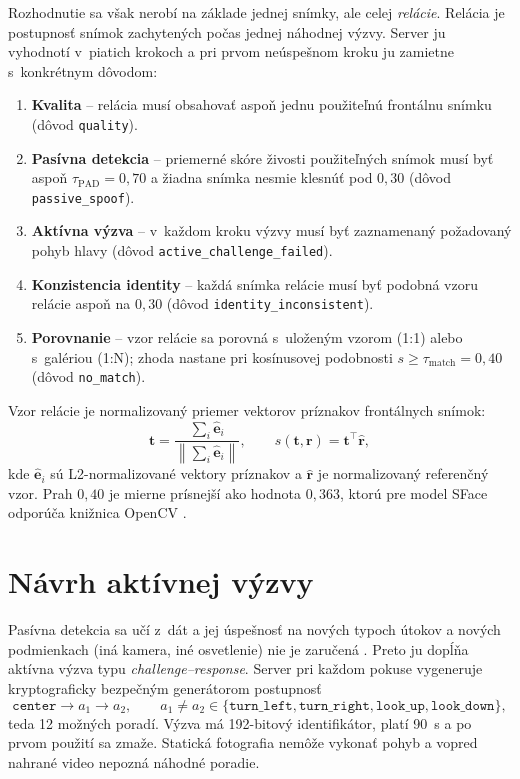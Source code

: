 Rozhodnutie sa však nerobí na základe jednej snímky, ale celej \emph{relácie}.
Relácia je postupnosť snímok zachytených počas jednej náhodnej výzvy. Server ju
vyhodnotí v~piatich krokoch a pri prvom neúspešnom kroku ju zamietne s~konkrétnym
dôvodom:

\begin{enumerate}
  \item \textbf{Kvalita} -- relácia musí obsahovať aspoň jednu použiteľnú frontálnu snímku
        (dôvod \texttt{quality}).
  \item \textbf{Pasívna detekcia} -- priemerné skóre živosti použiteľných snímok musí byť
        aspoň $\tau_{\mathrm{PAD}} = 0{,}70$ a žiadna snímka nesmie klesnúť pod $0{,}30$
        (dôvod \texttt{passive\_spoof}).
  \item \textbf{Aktívna výzva} -- v~každom kroku výzvy musí byť zaznamenaný požadovaný
        pohyb hlavy (dôvod \texttt{active\_challenge\_failed}).
  \item \textbf{Konzistencia identity} -- každá snímka relácie musí byť podobná vzoru
        relácie aspoň na $0{,}30$ (dôvod \texttt{identity\_inconsistent}).
  \item \textbf{Porovnanie} -- vzor relácie sa porovná s~uloženým vzorom (1:1) alebo
        s~galériou (1:N); zhoda nastane pri kosínusovej podobnosti
        $s \geq \tau_{\mathrm{match}} = 0{,}40$ (dôvod \texttt{no\_match}).
\end{enumerate}

Vzor relácie je normalizovaný priemer vektorov príznakov frontálnych snímok:
\begin{equation}
  \mathbf{t} = \frac{\sum_{i} \hat{\mathbf{e}}_i}{\left\lVert \sum_{i} \hat{\mathbf{e}}_i \right\rVert},
  \qquad
  s(\mathbf{t}, \mathbf{r}) = \mathbf{t}^{\top}\hat{\mathbf{r}},
\end{equation}
kde $\hat{\mathbf{e}}_i$ sú L2-normalizované vektory príznakov a $\hat{\mathbf{r}}$ je
normalizovaný referenčný vzor. Prah $0{,}40$ je mierne prísnejší ako hodnota $0{,}363$,
ktorú pre model SFace odporúča knižnica OpenCV \cite{opencvzoo}.

\section{Návrh aktívnej výzvy}

Pasívna detekcia sa učí z~dát a jej úspešnosť na nových typoch útokov a nových
podmienkach (iná kamera, iné osvetlenie) nie je zaručená \cite{sun2023rethinking}.
Preto ju dopĺňa aktívna výzva typu \emph{challenge--response}. Server pri každom pokuse
vygeneruje kryptograficky bezpečným generátorom postupnosť
\[
  \texttt{center} \rightarrow a_1 \rightarrow a_2,\qquad
  a_1 \neq a_2 \in \{\texttt{turn\_left}, \texttt{turn\_right}, \texttt{look\_up}, \texttt{look\_down}\},
\]
teda 12 možných poradí. Výzva má 192-bitový identifikátor, platí 90~s a po prvom
použití sa zmaže. Statická fotografia nemôže vykonať pohyb a vopred nahrané video
nepozná náhodné poradie.

